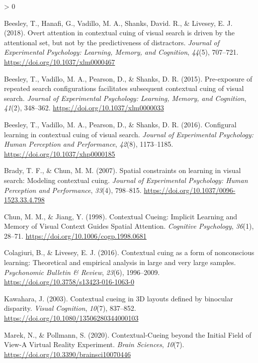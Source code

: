 \documentclass[
  english,
  man,floatsintext]{apa7}
\newlength{\cslhangindent}
\newenvironment{CSLReferences}[2] %
 {%
  \setlength{\parindent}{0pt}
  \ifodd #1 \everypar{\setlength{\hangindent}{\cslhangindent}}\ignorespaces\fi
  \ifnum #2 > 0
  \setlength{\parskip}{#2\baselineskip}
  \fi
 }%
 {}
\begin{document}
\hypertarget{refs}{}
\begin{CSLReferences}{1}{0}
\leavevmode\hypertarget{ref-beesley2018}{}%
Beesley, T., Hanafi, G., Vadillo, M. A., Shanks, David. R., \& Livesey, E. J. (2018). Overt attention in contextual cuing of visual search is driven by the attentional set, but not by the predictiveness of distractors. \emph{Journal of Experimental Psychology: Learning, Memory, and Cognition}, \emph{44}(5), 707--721. \url{https://doi.org/10.1037/xlm0000467}

\leavevmode\hypertarget{ref-beesley2015b}{}%
Beesley, T., Vadillo, M. A., Pearson, D., \& Shanks, D. R. (2015). Pre-exposure of repeated search configurations facilitates subsequent contextual cuing of visual search. \emph{Journal of Experimental Psychology: Learning, Memory, and Cognition}, \emph{41}(2), 348--362. \url{https://doi.org/10.1037/xlm0000033}

\leavevmode\hypertarget{ref-beesley2016}{}%
Beesley, T., Vadillo, M. A., Pearson, D., \& Shanks, D. R. (2016). Configural learning in contextual cuing of visual search. \emph{Journal of Experimental Psychology: Human Perception and Performance}, \emph{42}(8), 1173--1185. \url{https://doi.org/10.1037/xhp0000185}

\leavevmode\hypertarget{ref-brady2007}{}%
Brady, T. F., \& Chun, M. M. (2007). Spatial constraints on learning in visual search: {Modeling} contextual cuing. \emph{Journal of Experimental Psychology: Human Perception and Performance}, \emph{33}(4), 798--815. \url{https://doi.org/10.1037/0096-1523.33.4.798}

\leavevmode\hypertarget{ref-chun1998}{}%
Chun, M. M., \& Jiang, Y. (1998). Contextual {Cueing}: {Implicit Learning} and {Memory} of {Visual Context Guides Spatial Attention}. \emph{Cognitive Psychology}, \emph{36}(1), 28--71. \url{https://doi.org/10.1006/cogp.1998.0681}

\leavevmode\hypertarget{ref-colagiuri2016}{}%
Colagiuri, B., \& Livesey, E. J. (2016). Contextual cuing as a form of nonconscious learning: {Theoretical} and empirical analysis in large and very large samples. \emph{Psychonomic Bulletin \& Review}, \emph{23}(6), 1996--2009. \url{https://doi.org/10.3758/s13423-016-1063-0}

\leavevmode\hypertarget{ref-kawahara2003}{}%
Kawahara, J. (2003). Contextual cueing in {3D} layouts defined by binocular disparity. \emph{Visual Cognition}, \emph{10}(7), 837--852. \url{https://doi.org/10.1080/13506280344000103}

\leavevmode\hypertarget{ref-marek2020}{}%
Marek, N., \& Pollmann, S. (2020). Contextual-{Cueing} beyond the {Initial Field} of {View}-{A Virtual Reality Experiment}. \emph{Brain Sciences}, \emph{10}(7). \url{https://doi.org/10.3390/brainsci10070446}


\end{CSLReferences}
\end{document}
